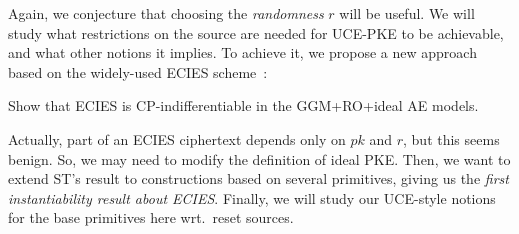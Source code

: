{\begin{itemize}
Again, we conjecture that choosing the \emph{randomness} $r$  will be useful.
We will study what restrictions on the source are needed for UCE-PKE to be achievable, and what other notions it implies. %
To achieve it, we propose a new approach  based on the  widely-used ECIES scheme~\cite{dhies}:
\begin{task} \label{task-2}
    Show that ECIES is CP-indifferentiable  in the GGM+RO+ideal AE models. 
\end{task}
Actually, part of an ECIES ciphertext depends only on $pk$ and $r$, but this seems benign. So, we may need to modify  the definition of ideal PKE.
Then, we want to extend ST's result to constructions based on several primitives, giving us the 
\emph{first instantiability result about ECIES}. %
Finally, we will study our UCE-style notions for the base primitives here wrt.~reset sources. %


\fi


 


\end{itemize}}
